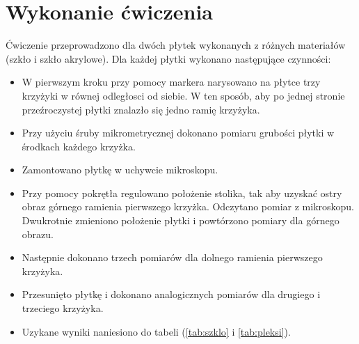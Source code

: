 \documentclass [a4paper,11pt]{article}
\begin{document}
	\section{Wykonanie ćwiczenia}
	Ćwiczenie przeprowadzono dla dwóch płytek wykonanych z różnych materiałów (szkło i  szkło akrylowe).
	Dla każdej płytki wykonano następujące czynności:
	\begin{itemize}
		\item W pierwszym kroku przy pomocy markera narysowano na płytce trzy krzyżyki w równej odległosci od siebie.
		W ten sposób, aby po jednej stronie przeźroczystej płytki znalazło się jedno ramię krzyżyka.
		\item 
			Przy użyciu śruby mikrometrycznej dokonano pomiaru grubości płytki w 
			środkach każdego krzyżka.
		\item Zamontowano płytkę w uchywcie mikroskopu. 
		\item Przy pomocy pokrętła regulowano położenie stolika, tak aby uzyskać ostry obraz 
		górnego ramienia pierwszego krzyżka.  Odczytano pomiar z mikroskopu. Dwukrotnie zmieniono położenie płytki i powtórzono pomiary dla górnego obrazu.
		\item Następnie dokonano trzech pomiarów dla dolnego ramienia pierwszego krzyżyka.
		\item Przesunięto płytkę i dokonano analogicznych pomiarów dla drugiego i trzeciego krzyżyka.
		\item Uzykane wyniki naniesiono do tabeli (\ref{tab:szklo} i \ref{tab:pleksi}).  
	\end{itemize}
	
\end{document}
